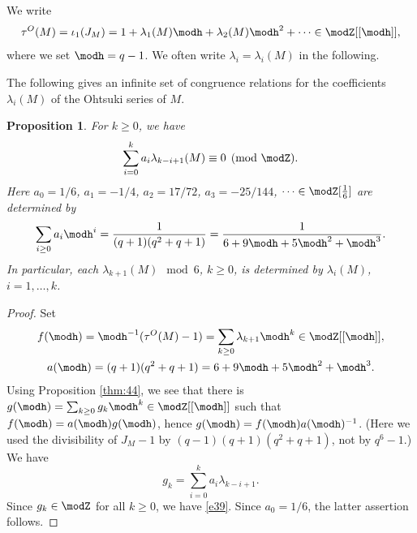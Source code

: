 \documentclass{amsart}
\numberwithin{equation}{section}
\numberwithin{figure}{section}
\theoremstyle{plain}
\newtheorem{proposition}[theorem]{Proposition}
\theoremstyle{definition}
\theoremstyle{remark}
\begin{document}
We write
\begin{equation*}
  \tau ^O(M)=\iota _1(J_M)=1+\lambda _1(M)\modh +\lambda _2(M)\modh ^2+\cdots\in \modZ [[\modh ]],
\end{equation*}
where we set $\modh =q-1$.  We often write $\lambda _i=\lambda _i(M)$ in the
following.

The following gives an infinite set of congruence relations for the
coefficients $\lambda _i(M)$ of the Ohtsuki series of $M$.

\begin{proposition}
  \label{r68}
  For $k\ge 0$, we have
  \begin{equation}
    \label{e39}
    \sum_{i=0}^k a_i\lambda _{k-i+1}(M)\equiv0\pmod{\modZ }.
  \end{equation}
  Here $a_0=1/6$, $a_1=-1/4$, $a_2=17/72$, $a_3=-25/144$,
  $\dots\in \modZ [\frac16]$ are determined by
  \begin{equation*}
    \sum_{i\ge 0}a_i\modh ^i=\frac1{(q+1)(q^2+q+1)}=\frac{1}{6+9\modh +5\modh ^2+\modh ^3}.
  \end{equation*}
  In particular, each $\lambda _{k+1}(M)\mod6$, $k\ge 0$, is determined by
  $\lambda _i(M)$, $i=1,\ldots,k$.
\end{proposition}

\begin{proof}
  Set
  \begin{gather*}
    f(\modh )=\modh ^{-1}(\tau ^O(M)-1)=\sum_{k\ge 0}\lambda _{k+1}\modh ^k\in \modZ [[\modh ]],\\
    a(\modh )=(q+1)(q^2+q+1)=6+9\modh +5\modh ^2+\modh ^3.
  \end{gather*}
  Using Proposition \ref{thm:44}, we see that there is
  $g(\modh )=\sum_{k\ge 0}g_k\modh ^k\in \modZ [[\modh ]]$ such that $f(\modh )=a(\modh )g(\modh )$,
  hence $g(\modh )=f(\modh )a(\modh )^{-1}$.  (Here we used the divisibility of
  $J_M-1$ by $(q-1)(q+1)(q^2+q+1)$, not by $q^6-1$.)
  We have
  \begin{equation*}
    g_k= \sum_{i=0}^k a_i\lambda _{k-i+1}.
  \end{equation*}
  Since $g_k\in \modZ $ for all $k\ge 0$, we have \eqref{e39}.  Since
  $a_0=1/6$, the latter assertion follows.
\end{proof}
\end{document}
